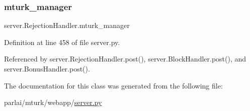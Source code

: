 \subsubsection{\texorpdfstring{mturk\+\_\+manager}{mturk\_manager}}
{\footnotesize\ttfamily server.\+Rejection\+Handler.\+mturk\+\_\+manager}



Definition at line 458 of file server.\+py.



Referenced by server.\+Rejection\+Handler.\+post(), server.\+Block\+Handler.\+post(), and server.\+Bonus\+Handler.\+post().



The documentation for this class was generated from the following file\+:\begin{DoxyCompactItemize}
\item 
parlai/mturk/webapp/\hyperlink{server_8py}{server.\+py}\end{DoxyCompactItemize}

